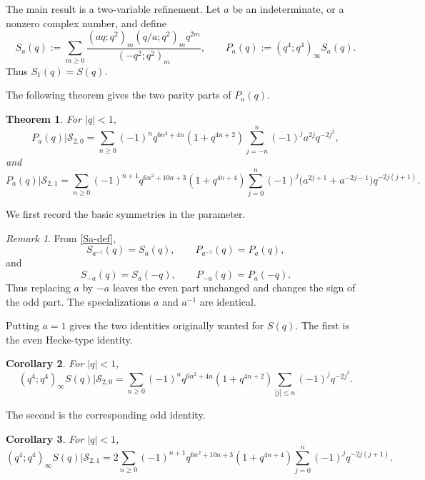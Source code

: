 \documentclass[11pt]{amsart}
\newtheorem{theorem}{Theorem}
\newtheorem{corollary}[theorem]{Corollary}
\theoremstyle{remark}
\newtheorem{remark}{Remark}
\newcommand{\sieve}[2]{\mathcal S_{#1,#2}}
\begin{document}
The main result is a two-variable refinement.  Let $a$ be an indeterminate, or a nonzero complex number, and define
\begin{equation}\label{Sa-def}
S_a(q):=\sum_{m\ge0}\frac{(aq;q^2)_m(q/a;q^2)_m q^{2m}}{(-q^2;q^2)_m},
\qquad
P_a(q):=(q^4;q^4)_\infty S_a(q).
\end{equation}
Thus $S_1(q)=S(q)$.

The following theorem gives the two parity parts of $P_a(q)$.

\begin{theorem}\label{thm:twovar}
For $|q|<1$,
\begin{equation}\label{twovar-even}
P_a(q)\big|\sieve{2}{0}
=
\sum_{n\ge0}(-1)^nq^{6n^2+4n}(1+q^{4n+2})
\sum_{j=-n}^{n}(-1)^j a^{2j}q^{-2j^2},
\end{equation}
and
\begin{equation}\label{twovar-odd}
P_a(q)\big|\sieve{2}{1}
=
\sum_{n\ge0}(-1)^{n+1}q^{6n^2+10n+3}(1+q^{4n+4})
\sum_{j=0}^{n}(-1)^j
\big(a^{2j+1}+a^{-2j-1}\big)q^{-2j(j+1)}.
\end{equation}
\end{theorem}

We first record the basic symmetries in the parameter.

\begin{remark}\label{rem:symmetries}
From \eqref{Sa-def},
\[
S_{a^{-1}}(q)=S_a(q),\qquad P_{a^{-1}}(q)=P_a(q),
\]
and
\[
S_{-a}(q)=S_a(-q),\qquad P_{-a}(q)=P_a(-q).
\]
Thus replacing $a$ by $-a$ leaves the even part unchanged and changes the sign of the odd part.  The specializations $a$ and $a^{-1}$ are identical.
\end{remark}

Putting $a=1$ gives the two identities originally wanted for $S(q)$.  The first is the even Hecke-type identity.

\begin{corollary}\label{cor:even}
For $|q|<1$,
\begin{equation}\label{even-main}
(q^4;q^4)_\infty S(q)\big|\sieve{2}{0}
=
\sum_{n\ge0}(-1)^nq^{6n^2+4n}(1+q^{4n+2})
\sum_{|j|\le n}(-1)^jq^{-2j^2}.
\end{equation}
\end{corollary}

The second is the corresponding odd identity.

\begin{corollary}\label{cor:odd}
For $|q|<1$,
\begin{equation}\label{odd-main}
(q^4;q^4)_\infty S(q)\big|\sieve{2}{1}
=
2\sum_{n\ge0}(-1)^{n+1}q^{6n^2+10n+3}(1+q^{4n+4})
\sum_{j=0}^{n}(-1)^jq^{-2j(j+1)}.
\end{equation}
\end{corollary}
\end{document}
